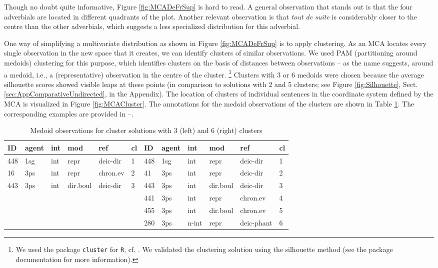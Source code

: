 Though no doubt quite informative, Figure \ref{fig:MCADeFrSup} is
hard to read. A general observation that stands out is that
the four adverbials are located in different quadrants of the
plot. Another relevant observation is that \textit{tout de suite} is
considerably closer to the centre than the other adverbials, which
suggests a less specialized distribution for this adverbial.

One way of simplifying a multivariate distribution as shown in Figure
\ref{fig:MCADeFrSup} is to apply clustering. As an MCA locates every
single observation in the new space that it creates, we can
identify clusters of similar observations. We used PAM (partitioning
around medoids) clustering for this purpose, which identifies clusters
on the basis of distances between observations -- as the name
suggests, around a medoid, i.e., a (representative) observation in the
centre of the cluster. \footnote{We used the package \verb+cluster+
  for \verb+R+, cf. \citet{cluster-package}. We validated the
  clustering solution using the silhouette method (see the package
  documentation for more information).} Clusters with 3 or 6 medoids
were chosen because the average silhouette scores showed visible leaps
at these points (in comparison to solutions with 2 and 5 clusters; see
Figure \ref{fig:Silhouette}, Sect. \ref{sec:AppComparativeUndirected},
in the Appendix). The location of clusters of individual sentences in
the coordinate system defined by the MCA is visualized in Figure
\ref{fig:MCACluster}.
%
The annotations for the medoid observations of the clusters are shown
in Table \ref{tab:Medoids}. The corresponding examples are provided in
--. 

\pagebreak

\begin{table}[H]
  \centering
  \scriptsize
    \begin{tabular}[h]{llllll|llllll}
    ID  & agent &int &mod   &   ref & cl & ID  & agent &int &mod   &   ref & cl \\\hline
    448   &1sg &int     &repr &deic-dir & 1 & 448   &1sg   &int     &repr   &deic-dir  &     1 \\
    16    &3ps &int     &repr &chron.ev & 2 & 41    &3ps   &int     &repr   &deic-dir  &     2 \\
    443   &3ps &int &dir.boul &deic-dir & 3 & 443  & 3ps   &int &dir.boul   &deic-dir  &     3 \\
    &   &&&&&441   &3ps   &int   &  repr &  chron.ev &      4\\
    &   &&&&&455   &3ps   &int &dir.boul &  chron.ev  &     5\\
    &   &&&&&280   &3ps &n-int  &   repr &deic-phant  &     6\\
  \end{tabular}
  \caption{Medoid observations for cluster solutions with 3 (left) and 6 (right) clusters}
  \label{tab:Medoids}
\end{table}

